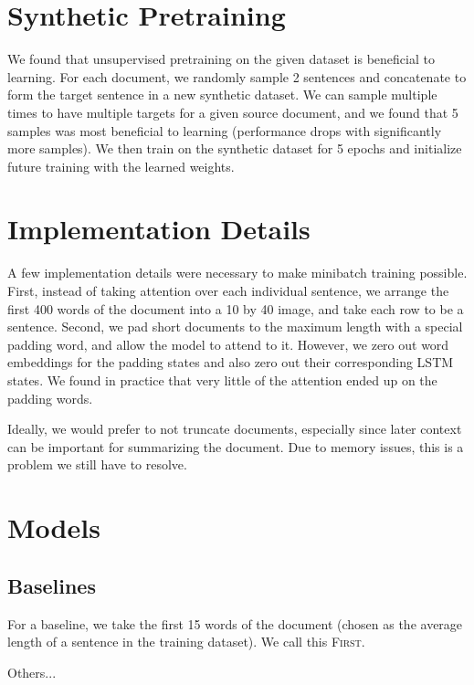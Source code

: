 \documentclass[11pt]{report}
\begin{document}
\section{Synthetic Pretraining} %

We found that unsupervised pretraining on the given dataset is beneficial to learning. For each document, we randomly sample 2 sentences and concatenate to form the target sentence in a new synthetic dataset. We can sample multiple times to have multiple targets for a given source document, and we found that 5 samples was most beneficial to learning (performance drops with significantly more samples). We then train on the synthetic dataset for 5 epochs and initialize future training with the learned weights.

\section{Implementation Details}

A few implementation details were necessary to make minibatch training possible. First, instead of taking attention over each individual sentence, we arrange the first 400 words of the document into a 10 by 40 image, and take each row to be a sentence. Second, we pad short documents to the maximum length with a special padding word, and allow the model to attend to it. However, we zero out word embeddings for the padding states and also zero out their corresponding LSTM states. We found in practice that very little of the attention ended up on the padding words.

Ideally, we would prefer to not truncate documents, especially since later context can be important for summarizing the document. Due to memory issues, this is a problem we still have to resolve.

\section{Models}

\subsection{Baselines}

For a baseline, we take the first 15 words of the document (chosen as the average length of a sentence in the training dataset). We call this \textsc{First}. 

Others...
\end{document}
